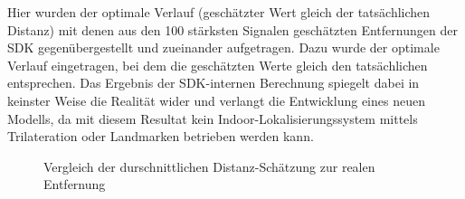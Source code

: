 Hier wurden der optimale Verlauf (geschätzter Wert gleich der tatsächlichen Distanz) mit denen aus den 100 stärksten Signalen geschätzten Entfernungen der SDK gegenübergestellt und zueinander aufgetragen. Dazu wurde der optimale Verlauf eingetragen, bei dem die geschätzten Werte gleich den tatsächlichen entsprechen. Das Ergebnis der SDK-internen Berechnung spiegelt dabei in keinster Weise die Realität wider und verlangt die Entwicklung eines neuen Modells, da mit diesem Resultat kein Indoor-Lokalisierungssystem mittels Trilateration oder Landmarken betrieben werden kann.  
\begin{figure}[H] 
\centering
{}
\caption{Vergleich der durschnittlichen Distanz-Schätzung zur realen Entfernung}
\label{fig:DisrealDistance}
\end{figure}
